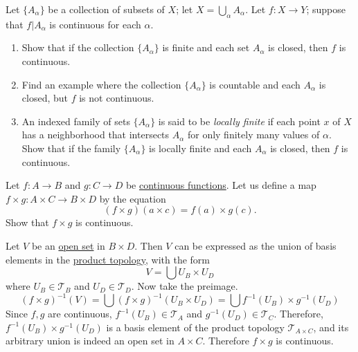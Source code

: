   \begin{exercise}[Munkres 18.9]
    Let $\{A_\alpha\}$ be a collection of subsets of $X$; let $X = \bigcup_\alpha A_\alpha$. Let $f : X \to Y$; suppose that $f|A_\alpha$ is continuous for each $\alpha$.
    \begin{enumerate}
      \item Show that if the collection $\{A_\alpha\}$ is finite and each set $A_\alpha$ is closed, then $f$ is continuous.
      \item Find an example where the collection $\{A_\alpha\}$ is countable and each $A_\alpha$ is closed, but $f$ is not continuous.
      \item An indexed family of sets $\{A_\alpha\}$ is said to be \textit{locally finite} if each point $x$ of $X$ has a neighborhood that intersects $A_\alpha$ for only finitely many values of $\alpha$. Show that if the family $\{A_\alpha\}$ is locally finite and each $A_\alpha$ is closed, then $f$ is continuous.
    \end{enumerate}
  \end{exercise}

  \begin{exercise}[Munkres 18.10]
    Let $f : A \to B$ and $g : C \to D$ be \hyperref[def:continuous_func]{continuous functions}. Let us define a map $f \times g : A \times C \to B \times D$ by the equation
    \begin{equation}
      (f \times g)(a \times c) = f(a) \times g(c).
    \end{equation}
    Show that $f \times g$ is continuous.
  \end{exercise}
  \begin{solution}
    Let $V$ be an \hyperref[def:open-set]{open set} in $B \times D$. Then $V$ can be expressed as the union of basis elements in the \hyperref[def:product-topology]{product topology}, with the form 
    \begin{equation}
      V = \bigcup U_B \times U_D
    \end{equation}
    where $U_B \in \mathscr{T}_B$ and $U_D \in \mathscr{T}_D$. Now take the preimage. 
    \begin{equation}
      (f \times g)^{-1} (V) = \bigcup (f \times g)^{-1} (U_B \times U_D) = \bigcup f^{-1}(U_B) \times g^{-1} (U_D)
    \end{equation}
    Since $f, g$ are continuous, $f^{-1} (U_B) \in \mathscr{T}_A$ and $g^{-1} (U_D) \in \mathscr{T}_C$. Therefore, $f^{-1} (U_B) \times g^{-1} (U_D)$ is a basis element of the product topology $\mathscr{T}_{A \times C}$, and its arbitrary union is indeed an open set in $A \times C$. Therefore $f \times g$ is continuous.  
  \end{solution}

